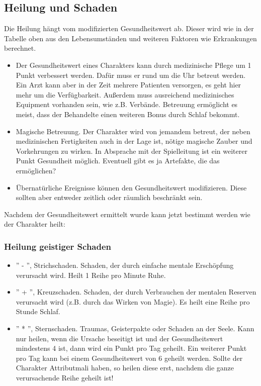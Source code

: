 \documentclass{article}
\begin{document}
\begin{center}
\subsection{Heilung und Schaden}
\end{center}

Die Heilung hängt vom modifizierten Gesundheitswert ab. Dieser wird wie in der Tabelle oben aus den Lebensumständen und
weiteren Faktoren wie Erkrankungen berechnet.

\begin{itemize}
\item Der Gesundheitswert eines Charakters kann durch medizinische Pflege um 1 Punkt verbessert werden. Dafür muss er rund um die Uhr betreut werden. Ein Arzt kann aber in der Zeit mehrere Patienten versorgen, es geht hier mehr um die Verfügbarkeit. Außerdem muss ausreichend medizinisches Equipment vorhanden sein, wie z.B. Verbände. Betreuung ermöglicht es meist, dass der Behandelte einen weiteren Bonus durch Schlaf bekommt.
\item Magische Betreuung. Der Charakter wird von jemandem betreut, der neben medizinischen Fertigkeiten auch in der Lage ist, nötige magische Zauber und Vorkehrungen zu wirken. In Absprache mit der Spielleitung ist ein weiterer Punkt Gesundheit möglich. Eventuell gibt es ja Artefakte, die das ermöglichen?
\item Übernatürliche Ereignisse können den Gesundheitswert modifizieren. Diese sollten aber entweder zeitlich oder räumlich beschränkt sein.
\end{itemize}

Nachdem der Gesundheitswert ermittelt wurde kann jetzt bestimmt werden wie der Charakter heilt:

\subsubsection{Heilung geistiger Schaden}

\begin{itemize}
\item '' - '', Strichschaden. Schaden, der durch einfache mentale Erschöpfung verursacht wird. Heilt 1 Reihe pro Minute Ruhe.
\item '' + '', Kreuzschaden. Schaden, der durch Verbrauchen der mentalen Reserven verursacht wird (z.B. durch das Wirken von Magie). Es heilt eine Reihe pro Stunde Schlaf.
\item '' * '', Sternschaden. Traumas, Geisterpakte oder Schaden an der Seele. Kann nur heilen, wenn die Ursache beseitigt ist und der Gesundheitswert mindestens 4 ist, dann wird ein Punkt pro Tag geheilt. Ein weiterer Punkt pro Tag kann bei einem Gesundheitswert von 6 geheilt werden. Sollte der Charakter Attributmali haben, so heilen diese erst, nachdem die ganze verursachende Reihe geheilt ist!
\end{itemize}
\end{document}
